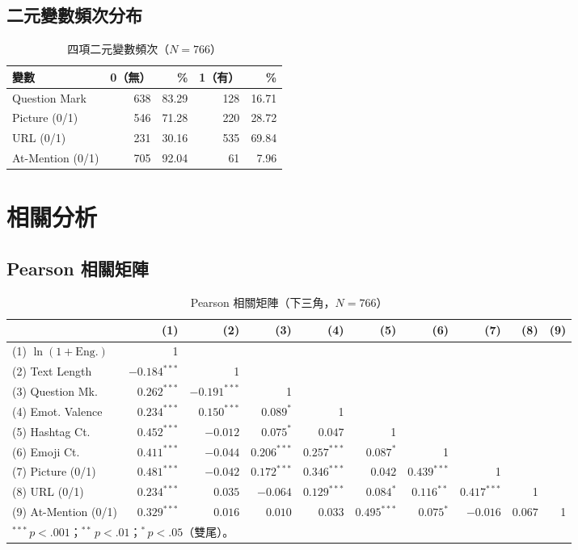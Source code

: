 \documentclass[12pt,a4paper]{ctexart}
\begin{document}
\subsection{二元變數頻次分布}

\begin{table}[H]
\centering
\caption{四項二元變數頻次（$N=766$）}
\small
\begin{tabular}{lrrrr}
\toprule
變數 & 0（無） & \% & 1（有） & \% \\
\midrule
Question Mark & 638 & 83.29 & 128 & 16.71 \\
Picture (0/1) & 546 & 71.28 & 220 & 28.72 \\
URL (0/1) & 231 & 30.16 & 535 & 69.84 \\
At-Mention (0/1) & 705 & 92.04 & 61 & 7.96 \\
\bottomrule
\end{tabular}
\end{table}

\newpage

\section{相關分析}

\subsection{Pearson 相關矩陣}

\begin{table}[H]
\centering
\caption{Pearson 相關矩陣（下三角，$N=766$）}
\label{tab:corr_full}
\small
\setlength{\tabcolsep}{3pt}
\begin{tabular}{lrrrrrrrrr}
\toprule
 & (1) & (2) & (3) & (4) & (5) & (6) & (7) & (8) & (9) \\
\midrule
(1) $\ln(1+\text{Eng.})$ & 1 & & & & & & & & \\
(2) Text Length & $-0.184^{***}$ & 1 & & & & & & & \\
(3) Question Mk. & $0.262^{***}$ & $-0.191^{***}$ & 1 & & & & & & \\
(4) Emot. Valence & $0.234^{***}$ & $0.150^{***}$ & $0.089^{*}$ & 1 & & & & & \\
(5) Hashtag Ct. & $0.452^{***}$ & $-0.012$ & $0.075^{*}$ & $0.047$ & 1 & & & & \\
(6) Emoji Ct. & $0.411^{***}$ & $-0.044$ & $0.206^{***}$ & $0.257^{***}$ & $0.087^{*}$ & 1 & & & \\
(7) Picture (0/1) & $0.481^{***}$ & $-0.042$ & $0.172^{***}$ & $0.346^{***}$ & $0.042$ & $0.439^{***}$ & 1 & & \\
(8) URL (0/1) & $0.234^{***}$ & $0.035$ & $-0.064$ & $0.129^{***}$ & $0.084^{*}$ & $0.116^{**}$ & $0.417^{***}$ & 1 & \\
(9) At-Mention (0/1) & $0.329^{***}$ & $0.016$ & $0.010$ & $0.033$ & $0.495^{***}$ & $0.075^{*}$ & $-0.016$ & $0.067$ & 1 \\
\bottomrule
\multicolumn{10}{l}{\small $^{***}\,p<.001$；$^{**}\,p<.01$；$^{*}\,p<.05$（雙尾）。} \\
\end{tabular}
\end{table}
\end{document}
